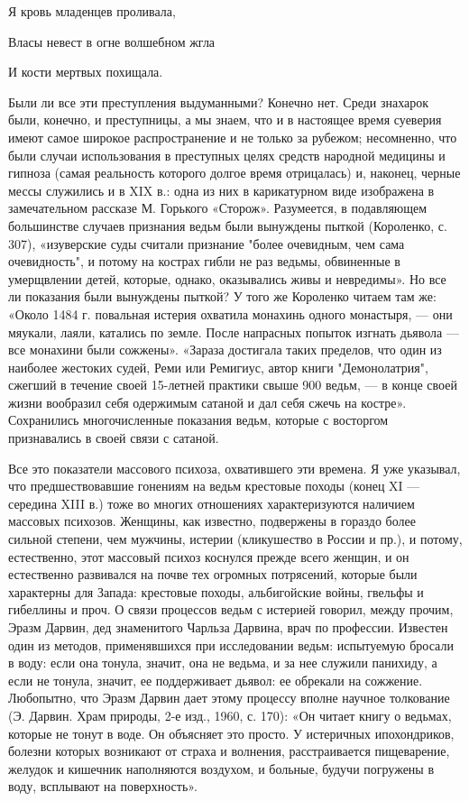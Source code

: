 Я кровь младенцев проливала,

Власы невест в огне волшебном жгла

И кости мертвых похищала.

Были ли все эти преступления выдуманными? Конечно нет. Среди знахарок были,
конечно, и преступницы, а мы знаем, что и в настоящее
время суеверия имеют самое широкое распространение и не только за рубежом;
несомненно, что были случаи использования в преступных целях средств народной
медицины и гипноза (самая реальность которого долгое время отрицалась) и,
наконец, черные мессы служились и в XIX в.: одна из них в карикатурном виде
изображена в замечательном рассказе М. Горького «Сторож». Разумеется, в
подавляющем большинстве случаев признания ведьм были вынуждены пыткой
(Короленко, с. 307), «изуверские суды считали признание "более очевидным, чем
сама очевидность", и потому на кострах гибли не раз ведьмы, обвиненные в
умерщвлении детей, которые, однако, оказывались живы и невредимы». Но все ли
показания были вынуждены пыткой? У того же Короленко читаем там же: «Около 1484
г. повальная истерия охватила монахинь одного монастыря, --- они мяукали, лаяли,
катались по земле. После напрасных попыток изгнать дьявола --- все монахини были
сожжены». «Зараза достигала таких пределов, что один из наиболее жестоких
судей, Реми или Ремигиус, автор книги "Демонолатрия", сжегший в течение своей
15-летней практики свыше 900 ведьм, --- в конце своей жизни вообразил себя
одержимым сатаной и дал себя сжечь на костре». Сохранились многочисленные
показания ведьм, которые с восторгом признавались в своей связи с сатаной.

Все это показатели массового психоза, охватившего эти времена. Я уже указывал,
что предшествовавшие гонениям на ведьм крестовые походы (конец XI --- середина
XIII в.) тоже во многих отношениях характеризуются наличием массовых психозов.
Женщины, как известно, подвержены в гораздо более сильной степени, чем мужчины,
истерии (кликушество в России и пр.), и потому, естественно, этот массовый
психоз коснулся прежде всего женщин, и он естественно развивался на почве тех
огромных потрясений, которые были характерны для Запада: крестовые походы,
альбигойские войны, гвельфы и гибеллины и проч. О связи процессов ведьм с
истерией говорил, между прочим, Эразм Дарвин, дед знаменитого Чарльза Дарвина,
врач по профессии. Известен один из методов, применявшихся при исследовании
ведьм: испытуемую бросали в воду: если она тонула, значит, она не ведьма, и за
нее служили панихиду, а если не тонула, значит, ее поддерживает дьявол: ее
обрекали на сожжение. Любопытно, что Эразм Дарвин дает этому процессу вполне
научное толкование (Э. Дарвин. Храм природы, 2-е изд., 1960, с. 170): «Он
читает книгу о ведьмах, которые не тонут в воде. Он объясняет это просто. У
истеричных ипохондриков, болезни которых возникают от страха и волнения,
расстраивается пищеварение, желудок и кишечник наполняются воздухом, и больные,
будучи погружены в воду, всплывают на поверхность».

